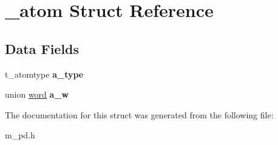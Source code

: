 \hypertarget{struct__atom}{}\section{\+\_\+atom Struct Reference}
\label{struct__atom}
\subsection*{Data Fields}
\begin{DoxyCompactItemize}
\item 
\mbox{\label{struct__atom_abfbcbf7ffdb9c9f8b2ef360ea5857210}} 
t\+\_\+atomtype {\bfseries a\+\_\+type}
\item 
\mbox{\label{struct__atom_a325629e2c919932ac1fe932036071bc7}} 
union \hyperlink{unionword}{word} {\bfseries a\+\_\+w}
\end{DoxyCompactItemize}


The documentation for this struct was generated from the following file\+:\begin{DoxyCompactItemize}
\item 
m\+\_\+pd.\+h\end{DoxyCompactItemize}

